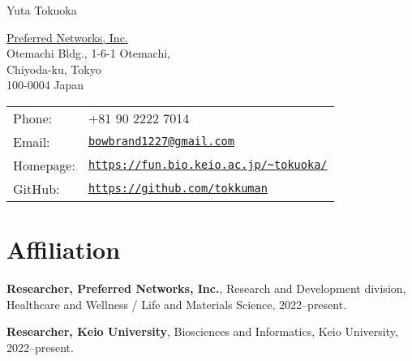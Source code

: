 \documentclass[letterpaper]{article}
\def\name{Yuta Tokuoka}
\renewenvironment{itemize}{
  \begin{list}{}{
    \setlength{\leftmargin}{1.5em}
  }
}{
  \end{list}
}
\begin{document}
{\huge \name}


\vspace{0.25in}

\begin{minipage}{0.45\linewidth}
  \href{http://www.unc.edu/}{Preferred Networks, Inc.} \\
  Otemachi Bldg., 1-6-1 Otemachi, \\
  Chiyoda-ku, Tokyo \\
  100-0004 Japan
\end{minipage}
\begin{minipage}{0.45\linewidth}
  \begin{tabular}{ll}
   Phone: & +81 90 2222 7014 \\
   Email: & \href{mailto:bowbrand1227@gmail.com}{\tt bowbrand1227@gmail.com} \\
   Homepage: & \href{https://fun.bio.keio.ac.jp/\~tokuoka/}{\tt \url{https://fun.bio.keio.ac.jp/\~tokuoka/}} \\
   GitHub: & \href{https://github.com/tokkuman}{\tt \url{https://github.com/tokkuman}} \\
  \end{tabular}
\end{minipage}

\vspace{0.6cm}




\section*{\bf Affiliation}
\vspace{-0.6cm}
\hrulefill

\begin{itemize}
 \item {\bf Researcher, Preferred Networks, Inc.}, Research and Development division, Healthcare and Wellness / Life and Materials Science, 2022--present.
 \item {\bf Researcher, Keio University}, Biosciences and Informatics, Keio University, 2022--present.
       \\
\end{itemize}
\end{document}
